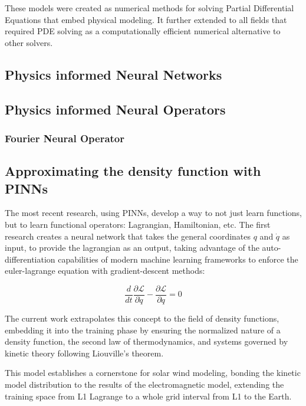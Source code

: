\documentclass[12pt]{article}
\begin{document}
These models were created as numerical methods for solving Partial Differential Equations that embed physical modeling. It further extended to all fields that required PDE solving as a computationally efficient numerical alternative to other solvers.

\subsection{Physics informed Neural Networks}

\subsection{Physics informed Neural Operators}

\subsubsection{Fourier Neural Operator}

\subsection{Approximating the density function with PINNs}
The most recent research, using PINNs, develop a way to not just learn functions, but to learn functional operators: Lagrangian, Hamiltonian, etc. \cite{cranmer2020lagrangianneuralnetworks, greydanus2019hamiltonianneuralnetworks} The first research creates a neural network that takes the general coordinates $q$ and $\dot q$ as input, to provide the lagrangian as an output, taking advantage of the auto-differentiation capabilities of modern machine learning frameworks to enforce the euler-lagrange equation with gradient-descent methods:

\begin{equation}
    \frac{d}{dt} \frac{\partial \mathcal{L}}{\partial \dot q} - \frac{\partial \mathcal{L}}{\partial q} = 0
\end{equation}

The current work extrapolates this concept to the field of density functions, embedding it into the training phase by ensuring the normalized nature of a density function, the second law of thermodynamics, and systems governed by kinetic theory following Liouville's theorem.

This model establishes a cornerstone for solar wind modeling, bonding the kinetic model distribution to the results of the electromagnetic model, extending the training space from     L1 Lagrange to a whole grid interval from L1 to the Earth.
\end{document}
